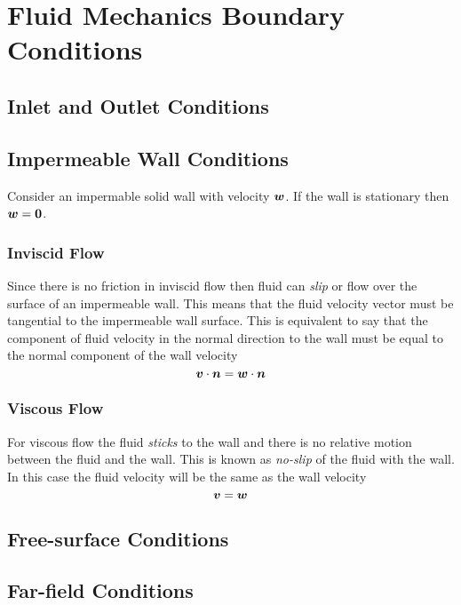 \section{Fluid Mechanics Boundary Conditions}
\label{sec:FluidBoundaryConditions}

\subsection{Inlet and Outlet Conditions}

\subsection{Impermeable Wall Conditions}

Consider an impermable solid wall with velocity $ \boldsymbol{w} $. If the wall is stationary then $ \boldsymbol{w} = \boldsymbol{0} $.

\subsubsection{Inviscid Flow}

Since there is no friction in inviscid flow then fluid can \emph{slip} or flow over the surface of an impermeable wall. This means that the fluid velocity vector must be tangential to the impermeable wall surface. This is equivalent to say that the component of fluid velocity in the normal direction to the wall must be equal to the normal component of the wall velocity \ie
\begin{equation}
    \boldsymbol{v}   \cdot   \boldsymbol{n}  =  \boldsymbol{w}   \cdot   \boldsymbol{n}  
\end{equation}

\subsubsection{Viscous Flow}

For viscous flow the fluid \emph{sticks} to the wall and there is no relative motion between the fluid and the wall. This is known as \emph{no-slip} of the fluid with the wall. In this case the fluid velocity will be the same as the wall velocity \ie
\begin{equation}
   \boldsymbol{v} = \boldsymbol{w} 
\end{equation}

\subsection{Free-surface Conditions}

\subsection{Far-field Conditions}


